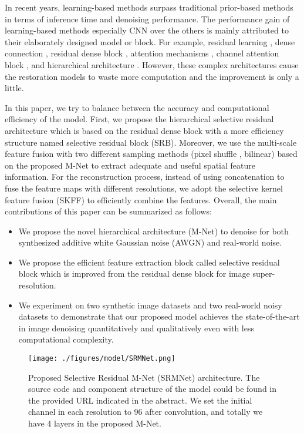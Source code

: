 \documentclass{article}
\begin{document}
In recent years, learning-based methods \cite{04,16,17} surpass traditional prior-based methods in terms of inference time and denoising performance. The performance gain of learning-based methods especially CNN over the others is mainly attributed to their elaborately designed model or block. For example, residual learning \cite{03,04}, dense connection \cite{05,06}, residual dense block \cite{07,08}, attention mechanisms \cite{09,10,11}, channel attention block \cite{09,12}, and hierarchical architecture \cite{13,14,15}. However, these complex architectures cause the restoration models to waste more computation and the improvement is only a little. 

In this paper, we try to balance between the accuracy and computational efficiency of the model. First, we propose the hierarchical selective residual architecture which is based on the residual dense block with a more efficiency structure named selective residual block (SRB). Moreover, we use the multi-scale feature fusion with two different sampling methods (pixel shuffle \cite{18}, bilinear) based on the proposed M-Net to extract adequate and useful spatial feature information. For the reconstruction process, instead of using concatenation to fuse the feature maps with different resolutions, we adopt the selective kernel feature fusion (SKFF) \cite{19,20} to efficiently combine the features. Overall, the main contributions of this paper can be summarized as follows:

\begin{itemize}
  \item We propose the novel hierarchical architecture (M-Net) to denoise for both synthesized additive white Gaussian noise (AWGN) and real-world noise.
  \item We propose the efficient feature extraction block called selective residual block which is improved from the residual dense block for image super-resolution.
  \item We experiment on two synthetic image datasets and two real-world noisy datasets to demonstrate that our proposed model achieves the state-of-the-art in image denoising quantitatively and qualitatively even with less computational complexity.
\end{itemize}

\begin{figure*}[!t]
\centering
	\texttt{[image: ./figures/model/SRMNet.png]}
	\caption{Proposed Selective Residual M-Net (SRMNet) architecture. The source code and component structure of the model could be found in the provided URL indicated in the abstract. We set the initial channel in each resolution to 96 after  convolution, and totally we have 4 layers in the proposed M-Net.}
	\label{SRMNet}
\end{figure*}
\end{document}
